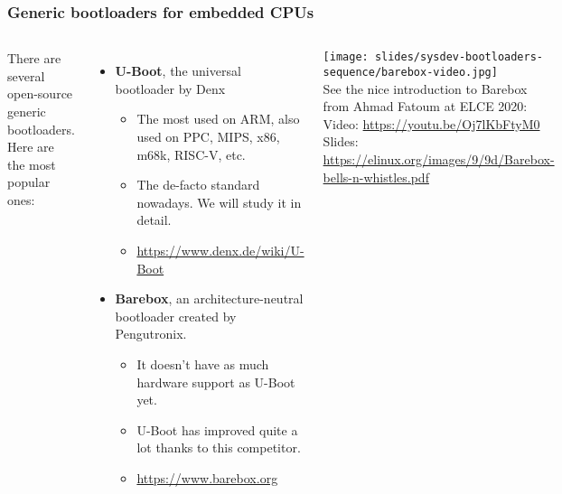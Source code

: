 \begin{frame}
  \frametitle{Generic bootloaders for embedded CPUs}
  \begin{columns}
  \small
  There are several open-source generic bootloaders.\\
  Here are the most popular ones:
  \begin{itemize}
  \item {\bf U-Boot}, the universal bootloader by Denx
      \begin{itemize}
        \item The most used on ARM, also used on PPC, MIPS, x86, m68k, RISC-V, etc.
        \item The de-facto standard nowadays. We will study it in detail.
         \item \url{https://www.denx.de/wiki/U-Boot}
      \end{itemize}
  \item {\bf Barebox}, an architecture-neutral bootloader created by Pengutronix.
      \begin{itemize}
        \item It doesn't have as much hardware support as U-Boot yet.
	\item U-Boot has improved quite a lot thanks to this competitor.
        \item \url{https://www.barebox.org}
      \end{itemize}
  \end{itemize}
    \vspace{2cm}
    \texttt{[image: slides/sysdev-bootloaders-sequence/barebox-video.jpg]}\\
    \vspace{0.3cm}
    \tiny See the nice introduction to Barebox\\
	  from Ahmad Fatoum at ELCE 2020:\\
          Video: \url{https://youtu.be/Oj7lKbFtyM0}\\
	  Slides: \url{https://elinux.org/images/9/9d/Barebox-bells-n-whistles.pdf}
  \end{columns}
\end{frame}

